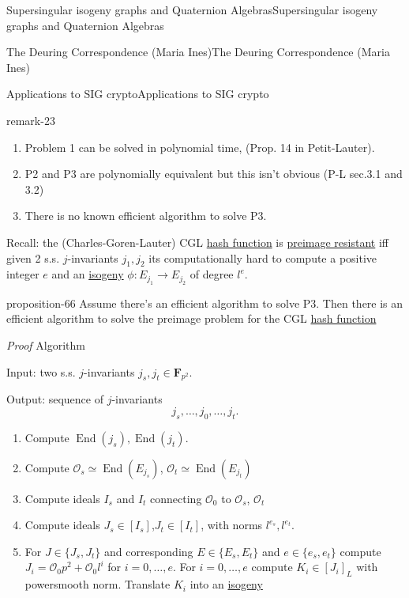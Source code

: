 \documentclass[10pt,]{book}
\makeatletter
\renewcommand*{\proofname}{Proof}
\renewenvironment{proof}[1][\proofname]{\par
  \pushQED{\qed}%
  \normalfont \topsep6\p@\@plus6\p@\relax
  \trivlist
  \item\relax
    {\itshape
    #1\@addpunct{.}}\hspace\labelsep\ignorespaces
}{%
  \popQED\endtrivlist\@endpefalse
}
\numberwithin{equation}{section}
\newcommand{\lb}{[}
\newcommand{\rb}{]}
\newcommand{\FF}{\mathbf{F}}
\newcommand{\ints}{\mathcal{O}}
\DeclareMathOperator{\End}{End}
\makeatother
\begin{document}
\begin{chapterptx}{Supersingular isogeny graphs and Quaternion Algebras}{}{Supersingular isogeny graphs and Quaternion Algebras}{}{}
\begin{sectionptx}{The Deuring Correspondence (Maria Ines)}{}{The Deuring Correspondence (Maria Ines)}{}{}
\begin{subsectionptx}{Applications to SIG crypto}{}{Applications to SIG crypto}{}{}
\begin{remark}{}{remark-23}
\hypertarget{p-975}{}%
\leavevmode%
\begin{enumerate}
\item\hypertarget{li-240}{}Problem 1 can be solved in polynomial time, (Prop. 14 in Petit-Lauter).%
\item\hypertarget{li-241}{}P2 and P3 are polynomially equivalent but this isn't obvious (P-L sec.3.1 and 3.2)%
\item\hypertarget{li-242}{}There is no known efficient algorithm to solve P3.%
\end{enumerate}
%
\end{remark}
\hypertarget{p-976}{}%
Recall: the (Charles-Goren-Lauter) CGL \hyperref[def-hash-function]{hash function} is \hyperref[def-preimage-resistance]{preimage resistant} iff given 2 s.s. \(j\)-invariants \(j_1,j_2\) its computationally hard to compute a  positive integer \(e\) and an \hyperref[def-supersing-isog-isog]{isogeny} \(\phi \colon E_{j_1} \to E_{j_2}\) of degree \(l^e\).%
\begin{proposition}{}{}{proposition-66}%
\hypertarget{p-977}{}%
Assume there's an efficient algorithm to solve P3. Then there is an efficient algorithm to solve the preimage problem for the CGL \hyperref[def-hash-function]{hash function}%
\end{proposition}
\begin{proof}\hypertarget{proof-109}{}
\hypertarget{p-978}{}%
Algorithm%
\par
\hypertarget{p-979}{}%
Input: two s.s. \(j\)-invariants \(j_s,j_t \in \FF_{p^2}\).%
\par
\hypertarget{p-980}{}%
Output: sequence of \(j\)-invariants%
\begin{equation*}
j_s,\ldots,j_0,\ldots, j_t\text{.}
\end{equation*}
%
\par
\hypertarget{p-981}{}%
\leavevmode%
\begin{enumerate}
\item\hypertarget{li-243}{}Compute \(\End(j_s),\End(j_t)\).%
\item\hypertarget{li-244}{}Compute \(\ints_s \simeq \End(E_{j_s})\), \(\ints_t \simeq \End(E_{j_t})\)%
\item\hypertarget{li-245}{}Compute ideals \(I_s\) and \(I_t\) connecting \(\ints_0 \) to \(\ints_s\), \(\ints_t\)%
\item\hypertarget{li-246}{}Compute ideals \(J_s \in \lb I_s \rb\),\(J_t \in \lb I_t \rb\), with norms \(l^{e_s},l^{e_t}\).%
\item\hypertarget{li-247}{}For \(J \in \{J_s,J_t\}\) and corresponding \(E \in \{E_s,E_t\}\) and \(e\in \{e_s, e_t\}\) compute \(J_i = \ints_0 p^2 + \ints_0 l^i\) for \(i = 0,\ldots, e\). For \(i = 0,\ldots, e\) compute \(K_i \in \lb J_i \rb_L\) with powersmooth norm. Translate \(K_i\) into an \hyperref[def-supersing-isog-isog]{isogeny}%

\end{enumerate}
\end{proof}
\end{subsectionptx}
\end{sectionptx}
\end{chapterptx}
\end{document}
